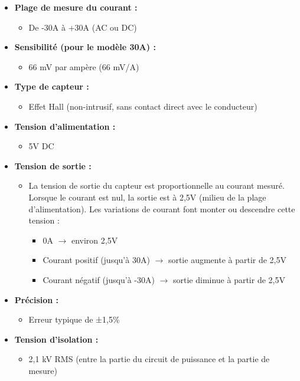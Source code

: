 \begin{itemize}
	\item \textbf{Plage de mesure du courant :} 
	\begin{itemize}
		\item De -30A à +30A (AC ou DC)
	\end{itemize}
	
	\item \textbf{Sensibilité (pour le modèle 30A) :}
	\begin{itemize}
		\item 66 mV par ampère (66 mV/A)
	\end{itemize}
	
	\item \textbf{Type de capteur :}
	\begin{itemize}
		\item Effet Hall (non-intrusif, sans contact direct avec le conducteur)
	\end{itemize}
	
	\item \textbf{Tension d'alimentation :} 
	\begin{itemize}
		\item 5V DC
	\end{itemize}
	
	\item \textbf{Tension de sortie :} 
	\begin{itemize}
		\item La tension de sortie du capteur est proportionnelle au courant mesuré. Lorsque le courant est nul, la sortie est à 2,5V (milieu de la plage d'alimentation). Les variations de courant font monter ou descendre cette tension :
		\begin{itemize}
			\item 0A $\rightarrow$ environ 2,5V
			\item Courant positif (jusqu’à 30A) $\rightarrow$ sortie augmente à partir de 2,5V
			\item Courant négatif (jusqu’à -30A) $\rightarrow$ sortie diminue à partir de 2,5V
		\end{itemize}
	\end{itemize}
	
	\item \textbf{Précision :}
	\begin{itemize}
		\item Erreur typique de ±1,5\%
	\end{itemize}
	
	\item \textbf{Tension d'isolation :}
	\begin{itemize}
		\item 2,1 kV RMS (entre la partie du circuit de puissance et la partie de mesure)
	\end{itemize}
	

\end{itemize}
